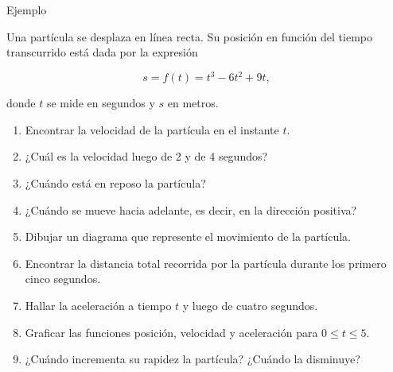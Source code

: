 \documentclass[
  letterpaper,
]{book}
\theoremstyle{plain}
\theoremstyle{remark}
\begin{document}
Ejemplo

Una partícula se desplaza en línea recta. Su posición en función del
tiempo transcurrido está dada por la expresión

\[
s=f(t)=t^3-6t^2+9t,
\]

donde \(t\) se mide en segundos y \(s\) en metros.

\begin{enumerate}
\def\labelenumi{\arabic{enumi}.}
\item
  Encontrar la velocidad de la partícula en el instante \(t\).
\item
  ¿Cuál es la velocidad luego de 2 y de 4 segundos?
\item
  ¿Cuándo está en reposo la partícula?
\item
  ¿Cuándo se mueve hacia adelante, es decir, en la dirección positiva?
\item
  Dibujar un diagrama que represente el movimiento de la partícula.
\item
  Encontrar la distancia total recorrida por la partícula durante los
  primero cinco segundos.
\item
  Hallar la aceleración a tiempo \(t\) y luego de cuatro segundos.
\item
  Graficar las funciones posición, velocidad y aceleración para
  \(0\leq t\leq 5\).
\item
  ¿Cuándo incrementa su rapidez la partícula? ¿Cuándo la disminuye?
\end{enumerate}
\end{document}
